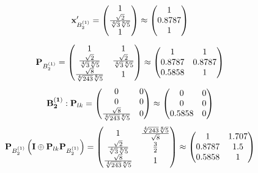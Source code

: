 \documentclass[10pt,a4paper]{article}
\begin{document}
	\[
		\bold{x}'_{B_2^{(1)}} = 
		\begin{pmatrix}
			{1} {} \\
			\frac{\sqrt{2}} {\sqrt[4]{3}\sqrt[8]{5}} \\
			{1} {} \\
		\end{pmatrix}
		\approx
		\begin{pmatrix}
			1        \\
			0.8787   \\
			1        \\
		\end{pmatrix}
	\]
	\[
		\bold{P}_{B_2^{(1)}} = 
		\begin{pmatrix}
			{1} {} & {1} {} \\
			\frac{\sqrt{2}} {\sqrt[4]{3}\sqrt[8]{5}} & \frac{\sqrt{2}} {\sqrt[4]{3}\sqrt[8]{5}} \\
			\frac{\sqrt{8}} {\sqrt[4]{243}\sqrt[8]{5}} & {1} {} \\
		\end{pmatrix}
		\approx
		\begin{pmatrix}
			1        & 1        \\
			0.8787   & 0.8787   \\
			0.5858   & 1        \\
		\end{pmatrix}
	\]
	\[
		\bold{B_2^{(1)}}: \bold{P}_{lk} = 
		\begin{pmatrix}
			{{0}} {} & {{0}} {} \\
			{{0}} {} & {{0}} {} \\
			\frac{\sqrt{8}} {\sqrt[4]{243}\sqrt[8]{5}} & {{0}} {} \\
		\end{pmatrix}
		\approx
		\begin{pmatrix}
			0        & 0        \\
			0        & 0        \\
			0.5858   & 0        \\
		\end{pmatrix}
	\]
	\[
		\bold{P}_{B_2^{(1)}}\left(\bold{I} \oplus \bold{P}_{lk}\bold{P}_{B_2^{(1)}}\right) = 
		\begin{pmatrix}
			{1} {} & \frac{\sqrt[4]{243}\sqrt[8]{5}} {\sqrt{8}} \\
			\frac{\sqrt{2}} {\sqrt[4]{3}\sqrt[8]{5}} & \frac{{3}} {{2}} \\
			\frac{\sqrt{8}} {\sqrt[4]{243}\sqrt[8]{5}} & {1} {} \\
		\end{pmatrix}
		\approx
		\begin{pmatrix}
			1        & 1.707    \\
			0.8787   & 1.5      \\
			0.5858   & 1        \\
		\end{pmatrix}
	\]
\end{document}

